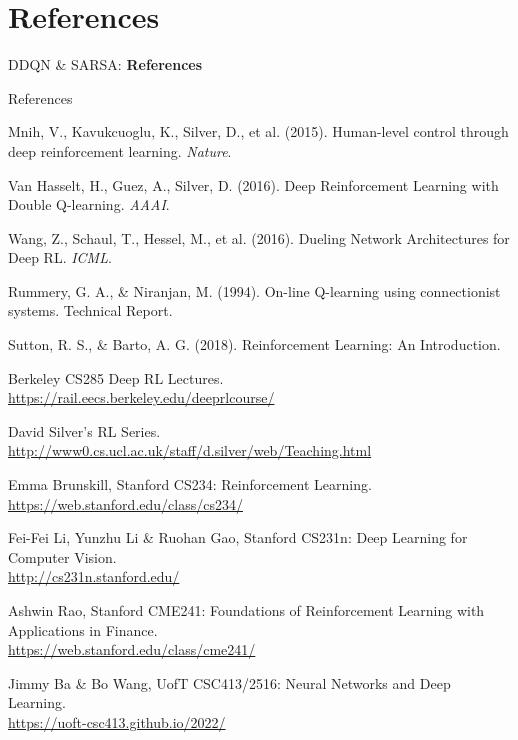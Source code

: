 \section{References}
\begin{frame}{}
    \LARGE DDQN \& SARSA: \textbf{References}
\end{frame}

\begin{frame}[allowframebreaks]{References}
\begin{thebibliography}{99}

Mnih, V., Kavukcuoglu, K., Silver, D., et al. (2015).
\newblock Human-level control through deep reinforcement learning.
\newblock \emph{Nature}.

Van Hasselt, H., Guez, A., Silver, D. (2016).
\newblock Deep Reinforcement Learning with Double Q-learning.
\newblock \emph{AAAI}.

Wang, Z., Schaul, T., Hessel, M., et al. (2016).
\newblock Dueling Network Architectures for Deep RL.
\newblock \emph{ICML}.

Rummery, G. A., \& Niranjan, M. (1994).
\newblock On-line Q-learning using connectionist systems.
\newblock Technical Report.

Sutton, R. S., \& Barto, A. G. (2018).
\newblock Reinforcement Learning: An Introduction.

Berkeley CS285 Deep RL Lectures.\\
\url{https://rail.eecs.berkeley.edu/deeprlcourse/}

David Silver’s RL Series.\\
\url{http://www0.cs.ucl.ac.uk/staff/d.silver/web/Teaching.html}

Emma Brunskill, Stanford CS234: Reinforcement Learning.\\
\url{https://web.stanford.edu/class/cs234/}

Fei-Fei Li, Yunzhu Li \& Ruohan Gao, Stanford CS231n: Deep Learning for Computer Vision.\\
\url{http://cs231n.stanford.edu/}

Ashwin Rao, Stanford CME241: Foundations of Reinforcement Learning with Applications in Finance.\\
\url{https://web.stanford.edu/class/cme241/}

Jimmy Ba \& Bo Wang, UofT CSC413/2516: Neural Networks and Deep Learning.\\
\url{https://uoft-csc413.github.io/2022/}

\end{thebibliography}
\end{frame}